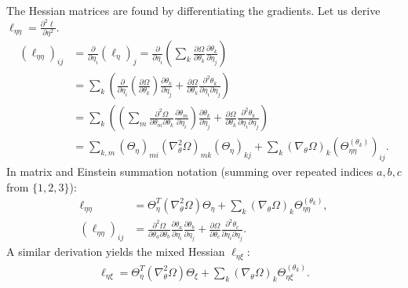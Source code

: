 \documentclass{article}
\begin{document}
The Hessian matrices are found by differentiating the gradients.
Let us derive $\ell_{\eta\eta} = \frac{\partial^2 \ell}{\partial \eta^2}$.
%
\begin{align}
  (\ell_{\eta\eta})_{ij} & = \frac{\partial}{\partial \eta_i} (\ell_\eta)_j = \frac{\partial}{\partial \eta_i} \left( \sum_k \frac{\partial \Omega}{\partial \theta_k} \frac{\partial \theta_k}{\partial \eta_j} \right)                                                                                                           \\
                         & = \sum_k \left( \frac{\partial}{\partial \eta_i}\left(\frac{\partial \Omega}{\partial \theta_k}\right) \frac{\partial \theta_k}{\partial \eta_j} + \frac{\partial \Omega}{\partial \theta_k} \frac{\partial^2 \theta_k}{\partial \eta_i \partial \eta_j} \right)                                        \\
                         & = \sum_k \left( \left( \sum_m \frac{\partial^2 \Omega}{\partial \theta_m \partial \theta_k} \frac{\partial \theta_m}{\partial \eta_i} \right) \frac{\partial \theta_k}{\partial \eta_j} + \frac{\partial \Omega}{\partial \theta_k} \frac{\partial^2 \theta_k}{\partial \eta_i \partial \eta_j} \right) \\
                         & = \sum_{k,m} (\Theta_\eta)_{mi} (\nabla_\theta^2 \Omega)_{mk} (\Theta_\eta)_{kj} + \sum_k (\nabla_\theta \Omega)_k (\Theta_{\eta\eta}^{(\theta_k)})_{ij}.
\end{align}
%
In matrix and Einstein summation notation (summing over repeated indices $a, b, c$ from $\{1,2,3\}$):
%
\begin{align}
  \ell_{\eta \eta}       & = \Theta_{\eta}^{T} (\nabla_\theta^2 \Omega) \Theta_\eta + \sum_k (\nabla_\theta \Omega)_{k}   \Theta_{\eta\eta}^{(\theta_k)},                                                                                                                               \\
  (\ell_{\eta\eta})_{ij} & = \frac{\partial^2 \Omega}{\partial \theta_a \partial \theta_b} \frac{\partial \theta_a}{\partial \eta_i} \frac{\partial \theta_b}{\partial \eta_j} + \frac{\partial \Omega}{\partial \theta_c} \frac{\partial^2 \theta_c}{\partial \eta_i \partial \eta_j}.
\end{align}
%
A similar derivation yields the mixed Hessian $\ell_{\eta\xi}$:
%
\begin{align}
  \ell_{\eta \xi} = \Theta_{\eta}^{T} (\nabla_\theta^2 \Omega) \Theta_\xi + \sum_k (\nabla_\theta \Omega)_{k}   \Theta_{\eta\xi}^{(\theta_k)}.
\end{align}
\end{document}
